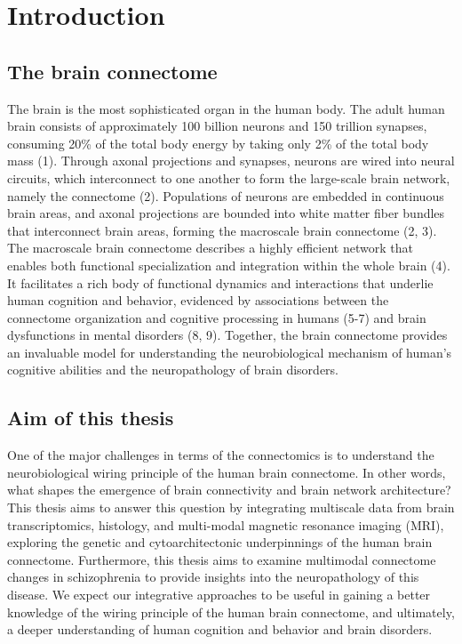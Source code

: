 \pagestyle{MyStyle}

\chapter[Introduction]{Introduction}
\label{ch:intro}

\vspace{3cm}

\begin{refsection}
\newpage
\section*{The brain connectome}
The brain is the most sophisticated organ in the human body. The adult human brain consists of approximately 100 billion neurons and 150 trillion synapses, consuming 20\% of the total body energy by taking only 2\% of the total body mass (1). Through axonal projections and synapses, neurons are wired into neural circuits, which interconnect to one another to form the large-scale brain network, namely the connectome (2). Populations of neurons are embedded in continuous brain areas, and axonal projections are bounded into white matter fiber bundles that interconnect brain areas, forming the macroscale brain connectome (2, 3). The macroscale brain connectome describes a highly efficient network that enables both functional specialization and integration within the whole brain (4). It facilitates a rich body of functional dynamics and interactions that underlie human cognition and behavior, evidenced by associations between the connectome organization and cognitive processing in humans (5-7) and brain dysfunctions in mental disorders (8, 9). Together, the brain connectome provides an invaluable model for understanding the neurobiological mechanism of human’s cognitive abilities and the neuropathology of brain disorders.

\section*{Aim of this thesis}
One of the major challenges in terms of the connectomics is to understand the neurobiological wiring principle of the human brain connectome. In other words, what shapes the emergence of brain connectivity and brain network architecture? This thesis aims to answer this question by integrating multiscale data from brain transcriptomics, histology, and multi-modal magnetic resonance imaging (MRI), exploring the genetic and cytoarchitectonic underpinnings of the human brain connectome. Furthermore, this thesis aims to examine multimodal connectome changes in schizophrenia to provide insights into the neuropathology of this disease. We expect our integrative approaches to be useful in gaining a better knowledge of the wiring principle of the human brain connectome, and ultimately, a deeper understanding of human cognition and behavior and brain disorders.


\end{refsection}
